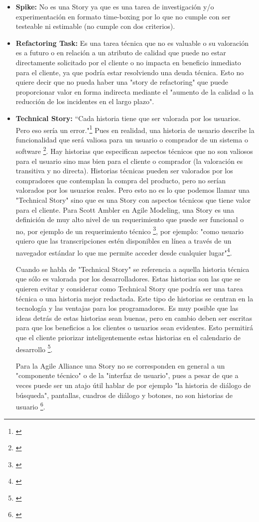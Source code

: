 \begin{itemize}

\item \textbf{Spike:}
No es una Story ya que es una tarea de investigación y/o experimentación en formato time-boxing por lo que no cumple con ser testeable ni estimable (no cumple con dos criterios).

\item \textbf{Refactoring Task:}
Es una tarea técnica que no es valuable o su valoración es a futuro o en relación a un atributo de calidad que puede no estar directamente solicitado por el cliente o no impacta en beneficio inmediato para el cliente, ya que podría estar resolviendo una deuda técnica. Esto no quiere decir que no pueda haber una "story de refactoring" que puede proporcionar valor en forma indirecta mediante el "aumento de la calidad o la reducción de los incidentes en el largo plazo".

\item \textbf{Technical Story:}
“Cada historia tiene que ser valorada por los usuarios. Pero eso sería un error."\footnote{\cite{Cohn-2004}} Pues en realidad, una historia de usuario describe la funcionalidad que será valiosa para un usuario o comprador de un sistema o software \footnote{\cite{Cohn-2004}}. Hay historias que especifican aspectos técnicos que no son valiosos para el usuario sino mas bien para el cliente o comprador (la valoración es transitiva y no directa). Historias técnicas pueden ser valorados por los compradores que contemplan la compra del producto, pero no serían valorados por los usuarios reales. Pero esto no es lo que podemos llamar una "Technical Story" sino que es una Story con aspectos técnicos que tiene valor para el cliente. Para Scott Ambler en Agile Modeling, una Story es una definición de muy alto nivel de un requerimiento que puede ser funcional o no, por ejemplo de un requerimiento técnico \footnote{\cite{Scott-Ambler-2015}}, por ejemplo: "como usuario quiero que las transcripciones estén disponibles en línea a través de un navegador estándar lo que me permite acceder desde cualquier lugar"\footnote{\cite{Scott-Ambler-2015}}.

Cuando se habla de "Technical Story" se referencia a aquella historia técnica que sólo es valorada por los desarrolladores. Estas historias son las que se quieren evitar y considerar como Technical Story que podría ser una tarea técnica o una historia mejor redactada. Este tipo de historias se centran en la tecnología y las ventajas para los programadores. Es muy posible que las ideas detrás de estas historias sean buenas, pero en cambio deben ser escritas para que los beneficios a los clientes o usuarios sean evidentes. Esto permitirá que el cliente priorizar inteligentemente estas historias en el calendario de desarrollo \footnote{\cite{Cohn-2004}}.

Para la Agile Alliance una Story no se corresponden en general a un "componente técnico" o de la "interfaz de usuario", pues a pesar de que a veces puede ser un atajo útil hablar de por ejemplo "la historia de diálogo de búsqueda", pantallas, cuadros de diálogo y botones, no son historias de usuario \footnote{\cite{Scrum-Alliance-2015}}.

\end{itemize}
